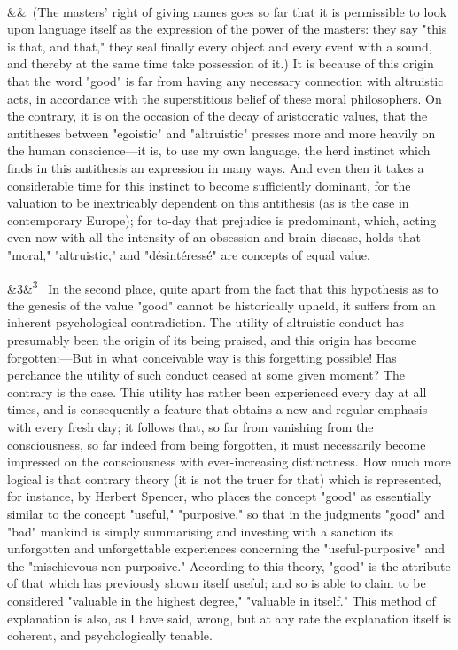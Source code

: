 \documentclass[12pt]{article}
\newcommand{\para}[1][]{\par\noindent\ifx&#1&\else\textsuperscript{\footnotesize #1}~\fi}
\begin{document}
\para (The masters' right of giving names goes so far that it is permissible to look upon language itself as the expression of the power of the masters: they say "this is that, and that," they seal finally every object and every event with a sound, and thereby at the same time take possession of it.) It is because of this origin that the word "good" is far from having any necessary connection with altruistic acts, in accordance with the superstitious belief of these moral philosophers. On the contrary, it is on the occasion of the decay of aristocratic values, that the antitheses between "egoistic" and "altruistic" presses more and more heavily on the human conscience---it is, to use my own language, the herd instinct which finds in this antithesis an expression in many ways. And even then it takes a considerable time for this instinct to become sufficiently dominant, for the valuation to be inextricably dependent on this antithesis (as is the case in contemporary Europe); for to-day that prejudice is predominant, which, acting even now with all the intensity of an obsession and brain disease, holds that "moral," "altruistic," and "désintéressé" are concepts of equal value.

\para[3] In the second place, quite apart from the fact that this hypothesis as to the genesis of the value "good" cannot be historically upheld, it suffers from an inherent psychological contradiction. The utility of altruistic conduct has presumably been the origin of its being praised, and this origin has become forgotten:---But in what conceivable way is this forgetting possible! Has perchance the utility of such conduct ceased at some given moment? The contrary is the case. This utility has rather been experienced every day at all times, and is consequently a feature that obtains a new and regular emphasis with every fresh day; it follows that, so far from vanishing from the consciousness, so far indeed from being forgotten, it must necessarily become impressed on the consciousness with ever-increasing distinctness. How much more logical is that contrary theory (it is not the truer for that) which is represented, for instance, by Herbert Spencer, who places the concept "good" as essentially similar to the concept "useful," "purposive," so that in the judgments "good" and "bad" mankind is simply summarising and investing with a sanction its unforgotten and unforgettable experiences concerning the "useful-purposive" and the "mischievous-non-purposive." According to this theory, "good" is the attribute of that which has previously shown itself useful; and so is able to claim to be considered "valuable in the highest degree," "valuable in itself." This method of explanation is also, as I have said, wrong, but at any rate the explanation itself is coherent, and psychologically tenable.
\end{document}
